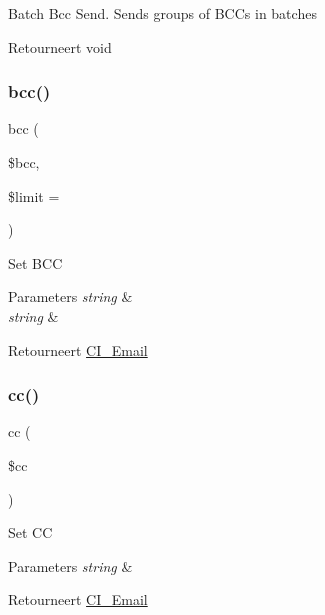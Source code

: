 Batch Bcc Send. Sends groups of B\+C\+Cs in batches

\begin{DoxyReturn}{Retourneert}
void 
\end{DoxyReturn}
\mbox{\label{class_c_i___email_ae7da2abc30865dd8ba3fcb3366889d7a}} 
\subsubsection{\texorpdfstring{bcc()}{bcc()}}
{\footnotesize\ttfamily bcc (\begin{DoxyParamCaption}\item[{}]{\$bcc,  }\item[{}]{\$limit = {\ttfamily \textquotesingle{}\textquotesingle{}} }\end{DoxyParamCaption})}

Set B\+CC


\begin{DoxyParams}{Parameters}
{\em string} & \\
\hline
{\em string} & \\
\hline
\end{DoxyParams}
\begin{DoxyReturn}{Retourneert}
\mbox{\hyperlink{class_c_i___email}{C\+I\+\_\+\+Email}} 
\end{DoxyReturn}
\mbox{\label{class_c_i___email_a785e883837f95eeffed21226563fc7e5}} 
\subsubsection{\texorpdfstring{cc()}{cc()}}
{\footnotesize\ttfamily cc (\begin{DoxyParamCaption}\item[{}]{\$cc }\end{DoxyParamCaption})}

Set CC


\begin{DoxyParams}{Parameters}
{\em string} & \\
\hline
\end{DoxyParams}
\begin{DoxyReturn}{Retourneert}
\mbox{\hyperlink{class_c_i___email}{C\+I\+\_\+\+Email}} 
\end{DoxyReturn}
\mbox{\label{class_c_i___email_ab8139994bc1b1bee3d2750b627cdd0c6}} 
